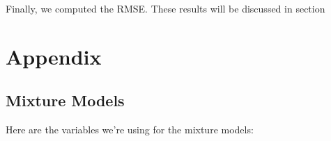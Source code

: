 \documentclass{article}
\begin{document}

Finally, we computed the RMSE. These results will be discussed in
section 



%



\section{Appendix}

\subsection{Mixture Models}
\label{sec:appendix-mixture}

Here are the variables we're using for the mixture models:
\end{document}

